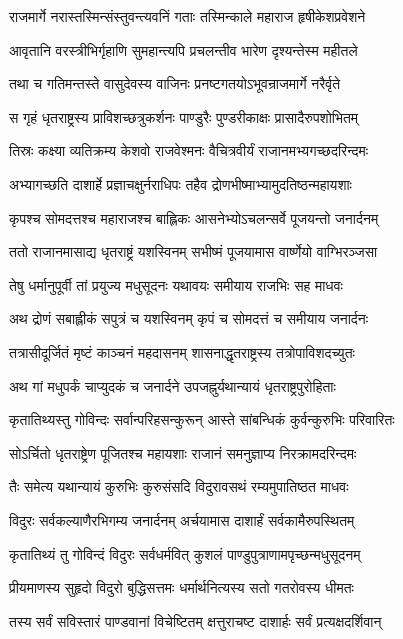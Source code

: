 \twolineshloka
{राजमार्गे नरास्तस्मिन्संस्तुवन्त्यवनिं गताः}
{तस्मिन्काले महाराज हृषीकेशप्रवेशने}


\twolineshloka
{आवृतानि वरस्त्रीभिर्गृहाणि सुमहान्त्यपि}
{प्रचलन्तीव भारेण दृश्यन्तेस्म महीतले}


\twolineshloka
{तथा च गतिमन्तस्ते वासुदेवस्य वाजिनः}
{प्रनष्टगतयोऽभूवन्राजमार्गे नरैर्वृते}


\twolineshloka
{स गृहं धृतराष्ट्रस्य प्राविशच्छत्रुकर्शनः}
{पाण्डुरैः पुण्डरीकाक्षः प्रासादैरुपशोभितम्}


\twolineshloka
{तिस्रः कक्ष्या व्यतिक्रम्य केशवो राजवेश्मनः}
{वैचित्रवीर्यं राजानमभ्यगच्छदरिन्दमः}


\twolineshloka
{अभ्यागच्छति दाशार्हे प्रज्ञाचक्षुर्नराधिपः}
{तहैव द्रोणभीष्माभ्यामुदतिष्ठन्महायशाः}


\twolineshloka
{कृपश्च सोमदत्तश्च महाराजश्च बाह्लिकः}
{आसनेभ्योऽचलन्सर्वे पूजयन्तो जनार्दनम्}


\twolineshloka
{ततो राजानमासाद्य धृतराष्ट्रं यशस्विनम्}
{सभीष्मं पूजयामास वार्ष्णेयो वाग्भिरञ्जसा}


\twolineshloka
{तेषु धर्मानुपूर्वी तां प्रयुज्य मधुसूदनः}
{यथावयः समीयाय राजभिः सह माधवः}


\twolineshloka
{अथ द्रोणं सबाह्लीकं सपुत्रं च यशस्विनम्}
{कृपं च सोमदत्तं च समीयाय जनार्दनः}


\twolineshloka
{तत्रासीदूर्जितं मृष्टं काञ्चनं महदासनम्}
{शासनाद्धृतराष्ट्रस्य तत्रोपाविशदच्युतः}


\twolineshloka
{अथ गां मधुपर्कं चाप्युदकं च जनार्दने}
{उपजह्नुर्यथान्यायं धृतराष्ट्रपुरोहिताः}


\twolineshloka
{कृतातिथ्यस्तु गोविन्दः सर्वान्परिहसन्कुरून्}
{आस्ते सांबन्धिकं कुर्वन्कुरुभिः परिवारितः}


\twolineshloka
{सोऽर्चितो धृतराष्ट्रेण पूजितश्च महायशाः}
{राजानं समनुज्ञाप्य निरक्रामदरिन्दमः}


\twolineshloka
{तैः समेत्य यथान्यायं कुरुभिः कुरुसंसदि}
{विदुरावसथं रम्यमुपातिष्ठत माधवः}


\twolineshloka
{विदुरः सर्वकल्याणैरभिगम्य जनार्दनम्}
{अर्चयामास दाशार्हं सर्वकामैरुपस्थितम्}


\twolineshloka
{कृतातिथ्यं तु गोविन्दं विदुरः सर्वधर्मवित्}
{कुशलं पाण्डुपुत्राणामपृच्छन्मधुसूदनम्}


\twolineshloka
{प्रीयमाणस्य सुहृदो विदुरो बुद्धिसत्तमः}
{धर्मार्थनित्यस्य सतो गतरोवस्य धीमतः}


\twolineshloka
{तस्य सर्वं सविस्तारं पाण्डवानां विचेष्टितम्}
{क्षत्तुराचष्ट दाशार्हः सर्वं प्रत्यक्षदर्शिवान्}


